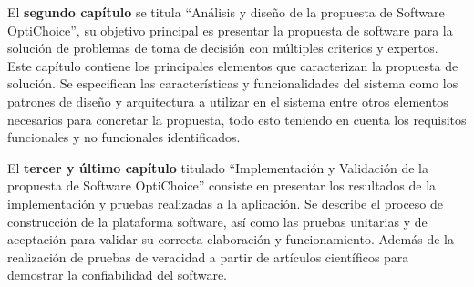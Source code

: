 El \textbf{segundo capítulo} se titula ``Análisis y diseño de la propuesta de Software OptiChoice'', su objetivo principal es presentar la propuesta de software para la solución de problemas de toma de decisión con múltiples criterios y expertos. Este capítulo contiene los principales elementos que caracterizan la propuesta de solución. Se especifican las características y funcionalidades del sistema como los patrones de diseño y arquitectura a utilizar en el sistema entre otros elementos necesarios para concretar la propuesta, todo esto teniendo en cuenta los requisitos funcionales y no funcionales identificados.

El \textbf{tercer y último capítulo} titulado ``Implementación y Validación de la propuesta de Software OptiChoice'' consiste en presentar los resultados de la implementación y pruebas realizadas a la aplicación. Se describe el proceso de construcción de la plataforma software, así como las pruebas unitarias y de aceptación para validar su correcta elaboración y funcionamiento. Además de la realización de pruebas de veracidad a partir de artículos científicos para demostrar la confiabilidad del software.

